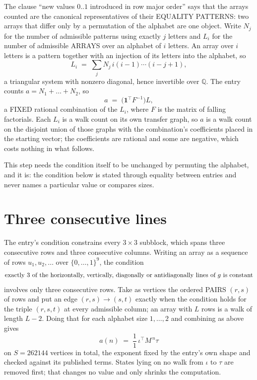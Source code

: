\documentclass[11pt,a4paper]{article}
\theoremstyle{plain}
\theoremstyle{definition}
\begin{document}
The clause ``new values $0..1$ introduced in row major order'' says that the arrays
counted are the canonical representatives of their EQUALITY PATTERNS: two arrays that differ
only by a permutation of the alphabet are one object. Write $N_j$ for the number of admissible
patterns using exactly $j$ letters and $L_i$ for the number of admissible ARRAYS over an
alphabet of $i$ letters. An array over $i$ letters is a pattern together with an injection of
its letters into the alphabet, so
\[
L_i\;=\;\sum_{j}N_j\,i(i-1)\cdots(i-j+1),
\]
a triangular system with nonzero diagonal, hence invertible over $\mathbb{Q}$. The entry
counts $a=N_1+\dots+N_{2}$, so
\[
a\;=\;\bigl(\mathbf{1}^{\!\top}F^{-1}\bigr)L ,
\]
a FIXED rational combination of the $L_i$, where $F$ is the matrix of falling factorials.
Each $L_i$ is a walk count on its own transfer graph, so $a$ is a walk count on the disjoint
union of those graphs with the combination's coefficients placed in the starting vector; the
coefficients are rational and some are negative, which costs nothing in what follows.

This step needs the condition itself to be unchanged by permuting the alphabet, and it is:
the condition below is stated through equality between entries and never names a particular
value or compares sizes.

\section{Three consecutive lines}

The entry's condition constrains every $3\times3$ subblock, which spans three consecutive
rows and three consecutive columns. Writing an array as a sequence of rows
$u_1,u_2,\dots$ over $\{0,\dots,1\}^{9}$, the condition
\[
\text{exactly }3\text{ of the horizontally, vertically, diagonally or antidiagonally lines of }g\text{ \text{is constant}}
\]
involves only three consecutive rows. Take as vertices the ordered PAIRS $(r,s)$ of
rows and put an edge $(r,s)\to(s,t)$ exactly when the condition holds for the triple
$(r,s,t)$ at every admissible column; an array with $L$ rows is a walk of length $L-2$.
Doing that for each alphabet size $1,\dots,2$ and combining as above gives
\[
a(n)\;=\;\frac{1}{1}\,\iota^{\!\top}M^{\,n}\tau
\]
on $S=262144$ vertices in total, the exponent fixed by the entry's own shape and checked against
its published terms. States lying on no walk from $\iota$ to $\tau$ are removed first; that
changes no value and only shrinks the computation.
\end{document}
